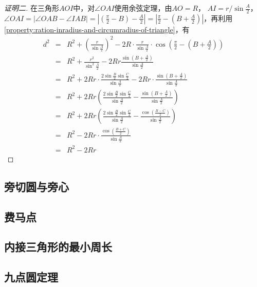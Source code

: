 \begin{proof}[证明二]
  在三角形$AOI$中，对$\angle OAI$使用余弦定理，由$AO=R$， $AI=r/\sin{\frac{A}{2}}$，$\angle OAI = \left| \angle OAB - \angle IAB \right| = \left| \left( \frac{\pi}{2}-B \right) - \frac{A}{2} \right| = \left| \frac{\pi}{2} - \left( B+\frac{A}{2} \right) \right|$，再利用\autoref{property:ration-inradius-and-circumradius-of-triangle}，有
  \begin{eqnarray*}
    d^2 & = & R^2+\left( \frac{r}{\sin{\frac{A}{2}}} \right)^2 - 2R \cdot \frac{r}{\sin{\frac{A}{2}}} \cdot \cos{\left( \frac{\pi}{2}-\left( B+\frac{A}{2} \right) \right)} \\
        & = & R^2 + \frac{r^2}{\sin^2 \frac{A}{2}} -2Rr \frac{\sin{\left( B+\frac{A}{2} \right)}}{\sin{\frac{A}{2}}} \\
    & = & R^2 + 2Rr \cdot \frac{2\sin{\frac{B}{2}}\sin{\frac{C}{2}}}{\sin{\frac{A}{2}}}-2Rr \cdot \frac{\sin{\left( B+\frac{A}{2} \right)}}{\sin{\frac{A}{2}}} \\
        & = & R^2 + 2Rr \left( \frac{2\sin{\frac{B}{2}}\sin{\frac{C}{2}}}{\sin{\frac{A}{2}}} - \frac{\sin{\left( B+\frac{A}{2} \right)}}{\sin{\frac{A}{2}}} \right) \\
        & = & R^2 + 2Rr \left( \frac{2\sin{\frac{B}{2}}\sin{\frac{C}{2}}}{\sin{\frac{A}{2}}} - \frac{\cos{\left( \frac{B-C}{2} \right)}}{\sin{\frac{A}{2}}} \right) \\
        & = & R^2 - 2Rr \cdot \frac{\cos{\left( \frac{B+C}{2} \right)}}{\sin{\frac{A}{2}}} \\
    & = & R^2 - 2Rr
  \end{eqnarray*}
\end{proof}

\subsection{旁切圆与旁心}
\label{sec:escenter}

\subsection{费马点}
\label{sec:fermat-point-of-triangle}

\subsection{内接三角形的最小周长}
\label{sec:min-girth-of-triangle-in-other}

\subsection{九点圆定理}
\label{sec:nine-point-theorem-of-triangle}



